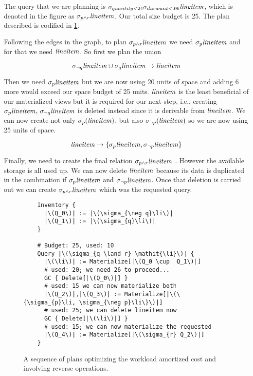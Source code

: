 The query that we are planning is \(\sigma_{quantity < 24}
\sigma_{discount < .06} \mathit{lineitem}\), which is denoted in the figure as
\(\sigma_{p \land r}\mathit{lineitem}\). Our total size budget is 25. The plan
described is codified in \ref{fig:reverse_operations}.

Following the edges in the graph, to plan \(\sigma_{p \land r}\mathit{lineitem}\)
we need \(\sigma_{p}\mathit{lineitem}\) and for that we need \(\mathit{lineitem}\). So first we plan the union

\[
  \sigma_{\neg q}\mathit{lineitem} \cup \sigma_{q}\mathit{lineitem} \rightarrow \mathit{lineitem}
\]

Then we need \(\sigma_{p}\mathit{lineitem}\) but we are now using 20 units of space
and adding 6 more would exceed our space budget of 25 units. \(\mathit{lineitem}\)
is the least beneficial of our materialized views but it is required
for our next step, i.e., creating \(\sigma_{p}\mathit{lineitem}\), \(\sigma_{\neg
q} \mathit{lineitem}\) is deleted instead since it is derivable from \(\mathit{lineitem}\). We can
now create not only \(\sigma_{p}(\mathit{lineitem})\), but also \(\sigma_{\neg
p}(\mathit{lineitem})\) so we are now using 25 units of space.

\[
  \mathit{lineitem} \rightarrow \{\sigma_{p}\mathit{lineitem}, \sigma_{\neg p}\mathit{lineitem}\}
\]

Finally, we need to create the final relation \(\sigma_{p \land
  r}\mathit{lineitem}\) . However the available storage is all used up. We can now
  delete \(\mathit{lineitem}\) because its data is duplicated in the combination if
  \(\sigma_{p}\mathit{lineitem}\) and \(\sigma_{\neg p}\mathit{lineitem}\). Once that deletion is
  carried out we can create \(\sigma_{p \land r} \mathit{lineitem} \) which was the
  requested query.


\begin{figure}[H]
\begin{verbatim}
    Inventory {
      |\(Q_0\)| := |\(\sigma_{\neg q}\li\)|
      |\(Q_1\)| := |\(\sigma_{q}\li\)|
    }

    # Budget: 25, used: 10
    Query |\(\sigma_{q \land r} \mathit{\li}\)| {
      |\(\li\)| := Materialize[|\(Q_0 \cup  Q_1\)|]
      # used: 20; we need 26 to proceed...
      GC { Delete[|\(Q_0\)|] }
      # used: 15 we can now materialize both
      |\(Q_2\)|,|\(Q_3\)| := Materialize[|\(\{\sigma_{p}\li, \sigma_{\neg p}\li\}\)|]
      # used: 25; we can delete lineitem now
      GC { Delete[|\(\li\)|] }
      # used: 15; we can now materialize the requested
      |\(Q_4\)| := Materialize[|\(\sigma_{r} Q_2\)|]
    }
\end{verbatim}
  \caption{\label{fig:reverse_operations}A sequence of plans optimizing
    the workload amortized cost and involving reverse operations.}
\end{figure}


